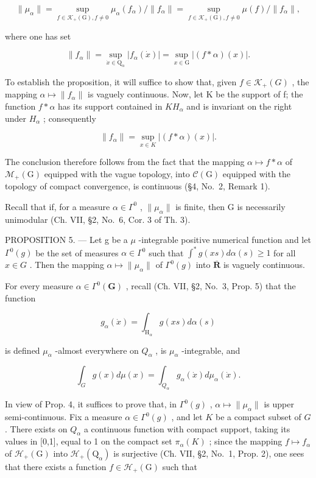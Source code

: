 \[
\| \mu_ {\alpha} \| = \sup _ {f \in \mathcal {K} _ {+} (\mathrm{G}), f \neq 0} \mu_ {\alpha} (f _ {\alpha}) / \| f _ {\alpha} \| = \sup _ {f \in \mathcal {K} _ {+} (\mathrm{G}), f \neq 0} \mu (f) / \| f _ {\alpha} \|,
\]

where one has set

\[
\left\| f _ {\alpha} \right\| = \sup _ {\dot {x} \in \mathrm{Q} _ {\alpha}} | f _ {\alpha} (\dot {x}) | = \sup _ {x \in \mathrm{G}} | (f * \alpha) (x) |.\tag{3}
\]

To establish the proposition, it will suffice to show that, given \(f \in \mathcal{K}_{+}(G)\) , the mapping \(\alpha \mapsto \|f_{\alpha}\|\) is vaguely continuous. Now, let K be the support of f; the function \(f * \alpha\) has its support contained in \(KH_{\alpha}\) and is invariant on the right under \(H_{\alpha}\) ; consequently

\[
\left\| f _ {\alpha} \right\| = \sup _ {x \in K} | (f * \alpha) (x) |.
\]

The conclusion therefore follows from the fact that the mapping \(\alpha\mapsto f*\alpha\) of \(\mathcal{M}_{+}(\mathrm{G})\) equipped with the vague topology, into \(\mathcal{C}(\mathrm{G})\) equipped with the topology of compact convergence, is continuous (§4, No.~2, Remark 1).

Recall that if, for a measure \(\alpha \in \Gamma^0\) , \(\| \mu_{\alpha}\|\) is finite, then G is necessarily unimodular (Ch. VII, §2, No.~6, Cor. 3 of Th. 3).

PROPOSITION 5. --- Let g be a \(\mu\) -integrable positive numerical function and let \(\Gamma^{0}(g)\) be the set of measures \(\alpha\in\Gamma^{0}\) such that \(\int^{*}g(xs)d\alpha(s)\geqslant1\) for all \(x\in G\) . Then the mapping \(\alpha\mapsto\|\mu_{\alpha}\|\) of \(\Gamma^{0}(g)\) into \(\overline{\mathbf{R}}\) is vaguely continuous.

For every measure \(\alpha \in \Gamma^0 (\mathbf{G})\) , recall (Ch. VII, §2, No.~3, Prop. 5) that the function

\[
g _ {\alpha} (\dot {x}) = \int_ {\mathrm{H} _ {\alpha}} g (x s) d \alpha (s)
\]

is defined \(\mu_{\alpha}\) -almost everywhere on \(Q_{\alpha}\) , is \(\mu_{\alpha}\) -integrable, and

\[
\int_ {G} g (x) d \mu (x) = \int_ {Q _ {\alpha}} g _ {\alpha} (\dot {x}) d \mu_ {\alpha} (\dot {x}).\tag{4}
\]

In view of Prop. 4, it suffices to prove that, in \(\Gamma^0(g)\) , \(\alpha \mapsto \| \mu_\alpha \|\) is upper semi-continuous. Fix a measure \(\alpha \in \Gamma^0(g)\) , and let \(K\) be a compact subset of \(G\) . There exists on \(Q_\alpha\) a continuous function with compact support, taking its values in {[}0,1{]}, equal to 1 on the compact set \(\pi_\alpha(K)\) ; since the mapping \(f \mapsto f_\alpha\) of \(\mathcal{H}_+(\mathrm{G})\) into \(\mathcal{H}_+(\mathrm{Q}_\alpha)\) is surjective (Ch. VII, §2, No.~1, Prop. 2), one sees that there exists a function \(f \in \mathcal{H}_+(\mathrm{G})\) such that


